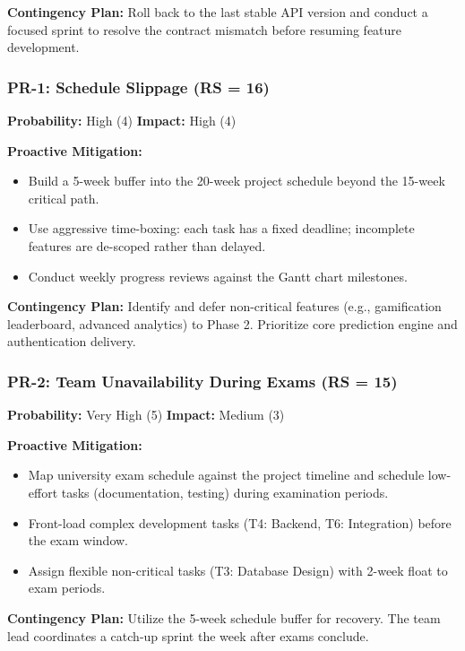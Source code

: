 \documentclass[12pt,a4paper]{article}
\begin{document}
\textbf{Contingency Plan:}
Roll back to the last stable API version and conduct a focused sprint to resolve the contract mismatch before resuming feature development.

\bigskip
\subsubsection*{PR-1: Schedule Slippage (RS = 16)}
\textbf{Probability:} High (4) \quad \textbf{Impact:} High (4)

\textbf{Proactive Mitigation:}
\begin{itemize}[noitemsep]
    \item Build a 5-week buffer into the 20-week project schedule beyond the 15-week critical path.
    \item Use aggressive time-boxing: each task has a fixed deadline; incomplete features are de-scoped rather than delayed.
    \item Conduct weekly progress reviews against the Gantt chart milestones.
\end{itemize}

\textbf{Contingency Plan:}
Identify and defer non-critical features (e.g., gamification leaderboard, advanced analytics) to Phase 2. Prioritize core prediction engine and authentication delivery.

\bigskip
\subsubsection*{PR-2: Team Unavailability During Exams (RS = 15)}
\textbf{Probability:} Very High (5) \quad \textbf{Impact:} Medium (3)

\textbf{Proactive Mitigation:}
\begin{itemize}[noitemsep]
    \item Map university exam schedule against the project timeline and schedule low-effort tasks (documentation, testing) during examination periods.
    \item Front-load complex development tasks (T4: Backend, T6: Integration) before the exam window.
    \item Assign flexible non-critical tasks (T3: Database Design) with 2-week float to exam periods.
\end{itemize}

\textbf{Contingency Plan:}
Utilize the 5-week schedule buffer for recovery. The team lead coordinates a catch-up sprint the week after exams conclude.

\bigskip
\end{document}
